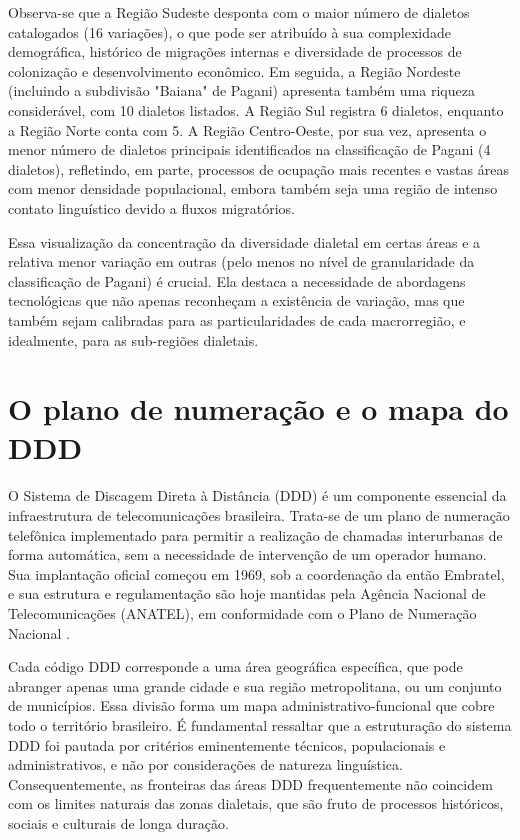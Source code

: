 Observa-se que a Região Sudeste desponta com o maior número de dialetos catalogados (16 variações), o que pode ser atribuído à sua complexidade demográfica, histórico de migrações internas e diversidade de processos de colonização e desenvolvimento econômico. Em seguida, a Região Nordeste (incluindo a subdivisão "Baiana" de Pagani) apresenta também uma riqueza considerável, com 10 dialetos listados. A Região Sul registra 6 dialetos, enquanto a Região Norte conta com 5. A Região Centro-Oeste, por sua vez, apresenta o menor número de dialetos principais identificados na classificação de Pagani (4 dialetos), refletindo, em parte, processos de ocupação mais recentes e vastas áreas com menor densidade populacional, embora também seja uma região de intenso contato linguístico devido a fluxos migratórios.

Essa visualização da concentração da diversidade dialetal em certas áreas e a relativa menor variação em outras (pelo menos no nível de granularidade da classificação de Pagani) é crucial. Ela destaca a necessidade de abordagens tecnológicas que não apenas reconheçam a existência de variação, mas que também sejam calibradas para as particularidades de cada macrorregião, e idealmente, para as sub-regiões dialetais.









\section{O plano de numeração e o mapa do DDD}


O Sistema de Discagem Direta à Distância (DDD) é um componente essencial da infraestrutura de telecomunicações brasileira. Trata-se de um plano de numeração telefônica implementado para permitir a realização de chamadas interurbanas de forma automática, sem a necessidade de intervenção de um operador humano. Sua implantação oficial começou em 1969, sob a coordenação da então Embratel, e sua estrutura e regulamentação são hoje mantidas pela Agência Nacional de Telecomunicações (ANATEL), em conformidade com o Plano de Numeração Nacional \cite{anatel_pnb, felipe_embratel_2005}.

Cada código DDD corresponde a uma área geográfica específica, que pode abranger apenas uma grande cidade e sua região metropolitana, ou um conjunto de municípios. Essa divisão forma um mapa administrativo-funcional que cobre todo o território brasileiro. É fundamental ressaltar que a estruturação do sistema DDD foi pautada por critérios eminentemente técnicos, populacionais e administrativos, e não por considerações de natureza linguística. Consequentemente, as fronteiras das áreas DDD frequentemente não coincidem com os limites naturais das zonas dialetais, que são fruto de processos históricos, sociais e culturais de longa duração.

